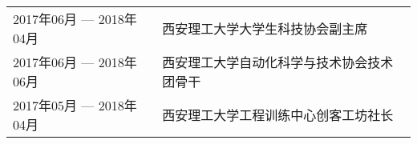 \begin{table}[!htbp]
    \begin{tabular}{ll}
        2017年06月 --- 2018年04月 & 西安理工大学大学生科技协会副主席           \\
        2017年06月 --- 2018年06月 & 西安理工大学自动化科学与技术协会技术团骨干 \\
        2017年05月 --- 2018年04月 & 西安理工大学工程训练中心创客工坊社长       \\
    \end{tabular}
\end{table}
